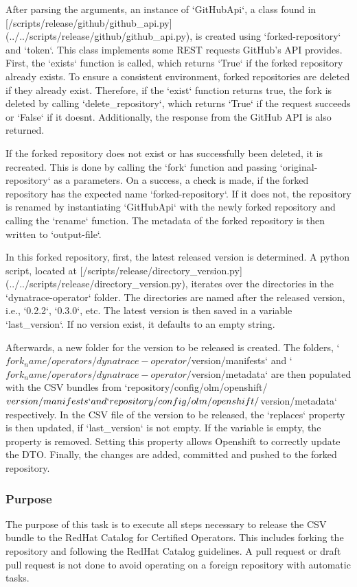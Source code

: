 After parsing the arguments, an instance of `GitHubApi`, a class found in [/scripts/release/github/github_api.py](../../scripts/release/github/github_api.py), is created using `{forked-repository}` and `{token}`.
This class implements some REST requests GitHub's API provides.
First, the `exists` function is called, which returns `True` if the forked repository already exists.
To ensure a consistent environment, forked repositories are deleted if they already exist.
Therefore, if the `exist` function returns true, the fork is deleted by calling `delete_repository`, which returns `True` if the request succeeds or `False` if it doesnt.
Additionally, the response from the GitHub API is also returned.

If the forked repository does not exist or has successfully been deleted, it is recreated.
This is done by calling the `fork` function and passing `{original-repository}` as a parameters.
On a success, a check is made, if the forked repository has the expected name `{forked-repository}`.
If it does not, the repository is renamed by instantiating `GitHubApi` with the newly forked repository and calling the `rename` function.
The metadata of the forked repository is then written to `{output-file}`.

In this forked repository, first, the latest released version is determined.
A python script, located at [/scripts/release/directory_version.py](../../scripts/release/directory_version.py), iterates over the directories in the `dynatrace-operator` folder.
The directories are named after the released version, i.e., `0.2.2`, `0.3.0`, etc.
The latest version is then saved in a variable `last_version`.
If no version exist, it defaults to an empty string.

Afterwards, a new folder for the version to be released is created.
The folders, `${fork_name}/operators/dynatrace-operator/${version}/manifests` and `${fork_name}/operators/dynatrace-operator/${version}/metadata` are then populated with the CSV bundles from `{repository}/config/olm/openshift/${version}/manifests` and `{repository}/config/olm/openshift/${version}/metadata` respectively.
In the CSV file of the version to be released, the `replaces` property is then updated, if `last_version` is not empty.
If the variable is empty, the property is removed.
Setting this property allows Openshift to correctly update the DTO.
Finally, the changes are added, committed and pushed to the forked repository.

\subsubsection{Purpose}\label{subsubsec:release-certified-operators-Purpose}

The purpose of this task is to execute all steps necessary to release the CSV bundle to the RedHat Catalog for Certified Operators.
This includes forking the repository and following the RedHat Catalog guidelines.
A pull request or draft pull request is not done to avoid operating on a foreign repository with automatic tasks.
